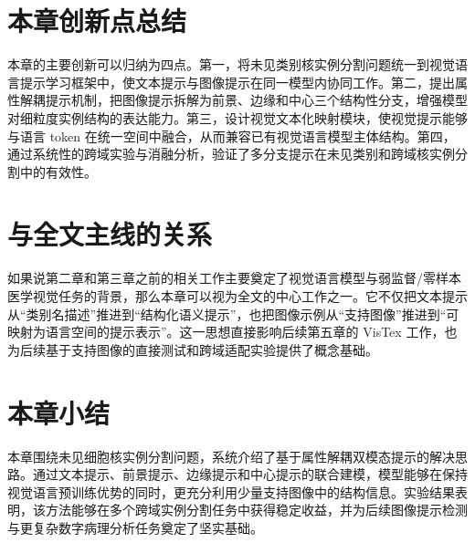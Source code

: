 \section{本章创新点总结}
本章的主要创新可以归纳为四点。第一，将未见类别核实例分割问题统一到视觉语言提示学习框架中，使文本提示与图像提示在同一模型内协同工作。第二，提出属性解耦提示机制，把图像提示拆解为前景、边缘和中心三个结构性分支，增强模型对细粒度实例结构的表达能力。第三，设计视觉文本化映射模块，使视觉提示能够与语言 token 在统一空间中融合，从而兼容已有视觉语言模型主体结构。第四，通过系统性的跨域实验与消融分析，验证了多分支提示在未见类别和跨域核实例分割中的有效性。

\section{与全文主线的关系}
如果说第二章和第三章之前的相关工作主要奠定了视觉语言模型与弱监督/零样本医学视觉任务的背景，那么本章可以视为全文的中心工作之一。它不仅把文本提示从“类别名描述”推进到“结构化语义提示”，也把图像示例从“支持图像”推进到“可映射为语言空间的提示表示”。这一思想直接影响后续第五章的 VisTex 工作，也为后续基于支持图像的直接测试和跨域适配实验提供了概念基础。

\section{本章小结}
本章围绕未见细胞核实例分割问题，系统介绍了基于属性解耦双模态提示的解决思路。通过文本提示、前景提示、边缘提示和中心提示的联合建模，模型能够在保持视觉语言预训练优势的同时，更充分利用少量支持图像中的结构信息。实验结果表明，该方法能够在多个跨域实例分割任务中获得稳定收益，并为后续图像提示检测与更复杂数字病理分析任务奠定了坚实基础。
